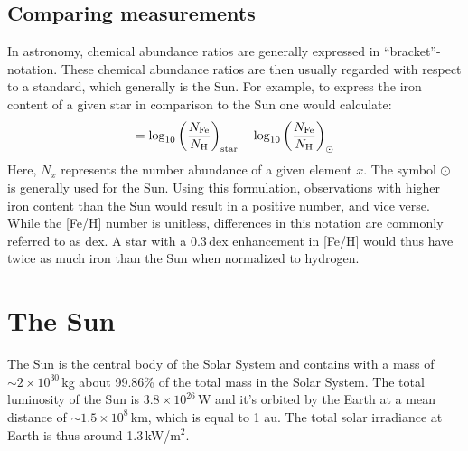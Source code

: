 \subsection{Comparing measurements}


In astronomy, chemical abundance ratios are generally expressed in ``bracket''-notation. These chemical abundance ratios are then usually regarded with respect to a standard, which generally is the Sun. For example, to express the iron content of a given star in comparison to the Sun one would calculate:
\begin{equation}
    [\tn{Fe}/\tn{H}] = \log_{10} \left( \frac{N_\tn{Fe}}{N_\tn{H}}\right)_\tn{star} - \log_{10} \left( \frac{N_\tn{Fe}}{N_\tn{H}}\right)_\odot
\end{equation}
Here, $N_x$ represents the number abundance of a given element $x$. The symbol $\odot$ is generally used for the Sun. Using this formulation, observations with higher iron content than the Sun would result in a positive number, and vice verse. While the [Fe/H] number is unitless, differences in this notation are commonly referred to as \ac{dex}. A star with a $0.3$\,dex enhancement in [Fe/H] would thus have twice as much iron than the Sun when normalized to hydrogen.




\section{The Sun}\label{sec:solar_system_abundances:the_sun}

The Sun is the central body of the Solar System and contains with a mass of $\sim2\times10^{30}$\,kg about 99.86\% of the total mass in the Solar System. The total luminosity of the Sun is $3.8\times10^{26}$\,W and it's orbited by the Earth at a mean distance of $\sim1.5\times10^{8}$\,km, which is equal to 1 \ac{au}. The total solar irradiance at Earth is thus around 1.3\,kW/m$^{2}$.

